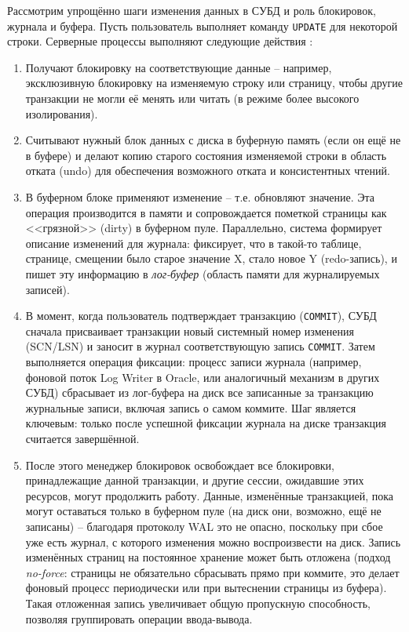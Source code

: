  Рассмотрим упрощённо шаги изменения данных в СУБД и роль блокировок, журнала и буфера. Пусть пользователь выполняет команду \texttt{UPDATE} для некоторой строки. Серверные процессы выполняют следующие действия \autocite{oracleessentialsc7}: 
 \begin{enumerate}
    \item Получают блокировку на соответствующие данные – например, эксклюзивную блокировку на изменяемую строку или страницу, чтобы другие транзакции не могли её менять или читать (в режиме более высокого изолирования). 
    \item Считывают нужный блок данных с диска в буферную память (если он ещё не в буфере) и делают копию старого состояния изменяемой строки в область отката (undo) для обеспечения возможного отката и консистентных чтений. 
    \item В буферном блоке применяют изменение – т.е. обновляют значение. Эта операция производится в памяти и сопровождается пометкой страницы как <<грязной>> (dirty) в буферном пуле. Параллельно, система формирует описание изменений для журнала: фиксирует, что в такой-то таблице, странице, смещении было старое значение X, стало новое Y (redo-запись), и пишет эту информацию в \textit{лог-буфер} (область памяти для журналируемых записей). 
    \item В момент, когда пользователь подтверждает транзакцию (\texttt{COMMIT}), СУБД сначала присваивает транзакции новый системный номер изменения (SCN/LSN) и заносит в журнал соответствующую запись \texttt{COMMIT}. Затем выполняется операция фиксации: процесс записи журнала (например, фоновой поток Log Writer в Oracle, или аналогичный механизм в других СУБД) сбрасывает из лог-буфера на диск все записанные за транзакцию журнальные записи, включая запись о самом коммите. Шаг является ключевым: только после успешной фиксации журнала на диске транзакция считается завершённой.
    \item После этого менеджер блокировок освобождает все блокировки, принадлежащие данной транзакции, и другие сессии, ожидавшие этих ресурсов, могут продолжить работу. Данные, изменённые транзакцией, пока могут оставаться только в буферном пуле (на диск они, возможно, ещё не записаны) – благодаря протоколу WAL это не опасно, поскольку при сбое уже есть журнал, с которого изменения можно воспроизвести на диск. Запись изменённых страниц на постоянное хранение может быть отложена (подход \textit{no-force}: страницы не обязательно сбрасывать прямо при коммите, это делает фоновый процесс периодически или при вытеснении страницы из буфера). Такая отложенная запись увеличивает общую пропускную способность, позволяя группировать операции ввода-вывода. 
 \end{enumerate}


